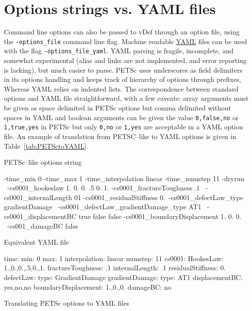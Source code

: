 \documentclass[10pt,oneside]{memoir}
\begin{document}
\section{Options strings vs. YAML files}
Command line options can also be passed to vDef through an option file, using the \verb+-options_file+ command line flag. Machine readable \href{http://www.yaml.org}{YAML} files can be used with the flag \verb+-options_file_yaml+. YAML parsing is fragile, incomplete, and somewhat experimental (alias and links are not implemented, and error reporting is lacking), but much easier to parse. PETSc  uses  underscores as field delimiters in its options handling and keeps track of hierarchy of options through prefixes, Whereas YAML relies on indented lists. The correspondence between standard options and YAML file straightforward, with a few caveats: array arguments must be given as space delimited in PETSc options but comma delimited without spaces in YAML and boolean arguments can be given the value \verb+0,false,no+ or \verb+1,true,yes+ in PETSc but only \verb+0,no+ or \verb+1,yes+ are acceptable in a YAML option file. An example of translation from PETSC--like to YAML options is given in Table~\ref{tab:PETSctoYAML}.

\begin{table}
PETSc--like options string\\
\small{
\begin{boxedverbatim}
-time_min 0 -time_max 1 -time_interpolation linear -time_numstep 11  -dryrun \
-cs0001_hookeslaw 1. 0. 0. .5 0. 1. -cs0001_fractureToughness .1 \
-cs0001_internalLength 01 -cs0001_residualStiffness 0.\
-cs0001_defectLaw_type gradientDamage \
-cs0001_defectLaw_gradientDamage_type AT1 \
-cs0001_displacementBC true false false -cs0001_boundaryDisplacement 1. 0. 0. \
-cs001_damageBC false
\end{boxedverbatim}
}
Equivalent YAML file\\
\small{
\begin{boxedverbatim}
time:
    min: 0
    max: 1
    interpolation: linear
    numstep: 11
cs0001:
    HookesLaw: 1.,0.,0.,.5,0.,1.
    fractureToughness: .1
    internalLength: .1
    residualStiffness: 0.
    defectLaw:
        type: GradientDamage
        gradientDamage:
            type: AT1
    displacementBC: yes,no,no
    boundaryDisplacement: 1.,0.,0.
    damageBC: no
\end{boxedverbatim}
}
\caption{Translating PETSc options to YAML files}
\label{tab:PETSctoYAML}
\end{table}
\end{document}
